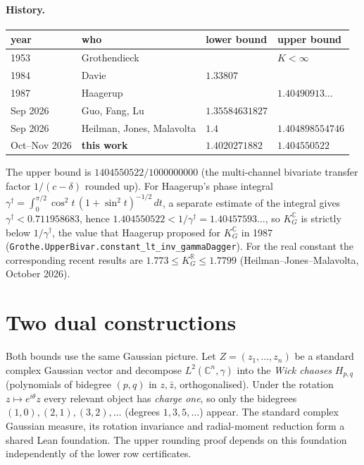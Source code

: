 \documentclass[11pt,a4paper]{article}
\newcommand{\C}{\mathbb{C}}
\newcommand{\R}{\mathbb{R}}
\newcommand{\KG}{K_G^{\C}}
\newcommand{\lean}[1]{\texttt{\small #1}}
\begin{document}
\paragraph{History.}
\begin{center}\small
\begin{tabular}{@{}llll@{}}\toprule
year & who & lower bound & upper bound\\\midrule
1953 & Grothendieck & & $K<\infty$\\
1984 & Davie & $1.33807$ & \\
1987 & Haagerup & & $1.40490913\ldots$\\
Sep 2026 & Guo, Fang, Lu & $1.35584631827$ & \\
Sep 2026 & Heilman, Jones, Malavolta & $1.4$ & $1.404898554746$\\
Oct--Nov 2026 & \textbf{this work} & $\mathbf{1.4020271882}$ & $\mathbf{1.404550522}$\\\bottomrule
\end{tabular}
\end{center}
The upper bound is $1404550522/1000000000$ (the multi-channel bivariate transfer factor $1/(c-\delta)$ rounded up).
For Haagerup's phase integral
$\gamma^\dagger=\int_0^{\pi/2}\cos^2 t\,(1+\sin^2 t)^{-1/2}\,dt$,
a separate estimate of the integral gives $\gamma^\dagger<0.711958683$, hence $1.404550522<1/\gamma^\dagger=1.40457593\ldots$, so $\KG$ is strictly below
$1/\gamma^\dagger$, the value that Haagerup proposed for $\KG$ in 1987
(\lean{Grothe.UpperBivar.constant\_lt\_inv\_gammaDagger}).
For the real constant the corresponding
recent results are $1.773\le K_G^{\R}\le1.7799$ (Heilman--Jones--Malavolta, October 2026).

\section{Two dual constructions}
Both bounds use the same Gaussian picture. Let $Z=(z_1,\dots,z_n)$ be a standard complex Gaussian vector and decompose
$L^2(\C^n,\gamma)$ into the \emph{Wick chaoses} $H_{p,q}$ (polynomials of bidegree $(p,q)$ in $z,\bar z$, orthogonalised).
Under the rotation $z\mapsto e^{i\theta}z$ every relevant object has \emph{charge one}, so only the bidegrees
$(1,0),(2,1),(3,2),\dots$ (degrees $1,3,5,\dots$) appear.
The standard complex Gaussian measure, its rotation invariance and radial-moment reduction
form a shared Lean foundation. The upper rounding proof depends on this foundation
independently of the lower row certificates.
\end{document}
